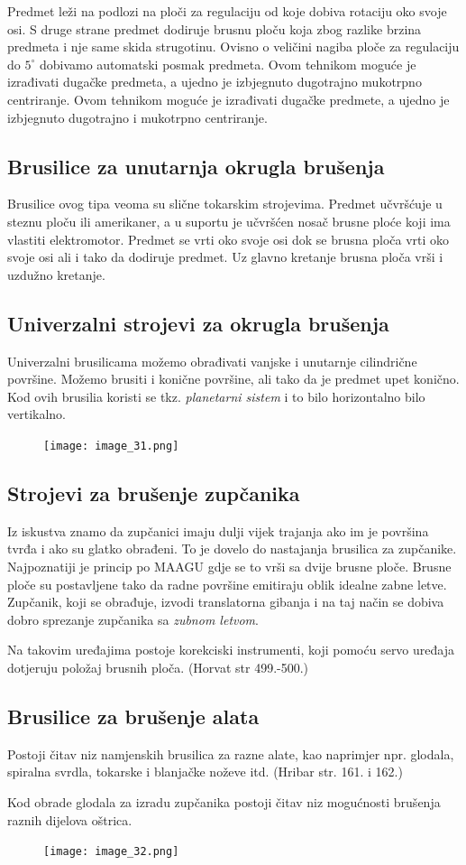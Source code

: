 \documentclass[a4paper,12pt]{article}
\numberwithin{figure}{section}
\begin{document}
\FloatBarrier
Predmet leži na podlozi na ploči za regulaciju od koje dobiva rotaciju oko svoje osi. S druge strane predmet dodiruje brusnu ploču koja zbog razlike brzina predmeta i nje same skida strugotinu. Ovisno o veličini nagiba ploče za regulaciju do $5^{\circ}$ dobivamo automatski posmak predmeta. Ovom tehnikom moguće je izrađivati dugačke predmeta, a ujedno je izbjegnuto dugotrajno mukotrpno centriranje. Ovom tehnikom moguće je izrađivati dugačke predmete, a ujedno je izbjegnuto dugotrajno i mukotrpno centriranje. 
\subsection{Brusilice za unutarnja okrugla brušenja}
Brusilice ovog tipa veoma su slične tokarskim strojevima. Predmet učvršćuje u steznu ploču ili amerikaner, a u suportu je učvršćen nosač brusne ploće koji ima vlastiti elektromotor. Predmet se vrti oko svoje osi dok se brusna ploča vrti oko svoje osi ali i tako da dodiruje predmet. Uz glavno kretanje brusna ploča vrši i uzdužno kretanje.
\subsection{Univerzalni strojevi za okrugla brušenja}
Univerzalni brusilicama možemo obrađivati vanjske i unutarnje cilindrične površine. Možemo brusiti i konične površine, ali tako da je predmet upet konično. Kod ovih brusilia koristi se tkz. \textit{planetarni sistem} i to bilo horizontalno bilo vertikalno.
\begin{figure}[!h]
\centering
\texttt{[image: image\_31.png]}
\end{figure}
\FloatBarrier
\subsection{Strojevi za brušenje zupčanika}
Iz iskustva znamo da zupčanici imaju dulji vijek trajanja ako im je površina tvrđa i ako su glatko obrađeni. To je dovelo do nastajanja brusilica za zupčanike. Najpoznatiji je princip po MAAGU gdje se to vrši sa dvije brusne ploče. Brusne ploče su postavljene tako da radne površine emitiraju oblik idealne zabne letve. Zupčanik, koji se obrađuje, izvodi translatorna gibanja i na taj način se dobiva dobro sprezanje zupčanika sa \textit{zubnom letvom}. \par 
Na takovim uređajima postoje korekciski instrumenti, koji pomoću servo uređaja dotjeruju položaj brusnih ploča. (Horvat str 499.-500.)
\subsection{Brusilice za brušenje alata}
Postoji čitav niz namjenskih brusilica za razne alate, kao naprimjer npr. glodala, spiralna svrdla, tokarske i blanjačke noževe itd. (Hribar str. 161. i 162.)\par
Kod obrade glodala za izradu zupčanika postoji čitav niz mogućnosti brušenja raznih dijelova oštrica.
\begin{figure}[!h]
\centering
\texttt{[image: image\_32.png]}
\end{figure}
\FloatBarrier
\end{document}
